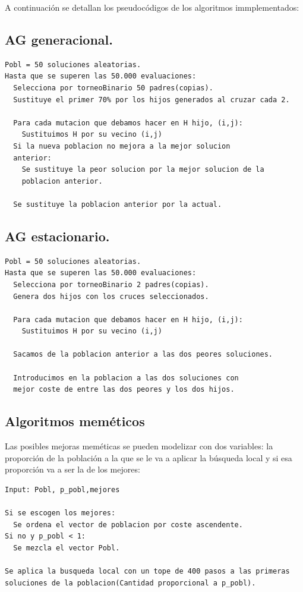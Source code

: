 A continuación se detallan los pseudocódigos de los algoritmos immplementados:\\

\subsection{AG generacional.}

\begin{lstlisting}
Pobl = 50 soluciones aleatorias.
Hasta que se superen las 50.000 evaluaciones:
  Selecciona por torneoBinario 50 padres(copias).
  Sustituye el primer 70% por los hijos generados al cruzar cada 2.
  
  Para cada mutacion que debamos hacer en H hijo, (i,j):
    Sustituimos H por su vecino (i,j)
  Si la nueva poblacion no mejora a la mejor solucion
  anterior:
    Se sustituye la peor solucion por la mejor solucion de la
    poblacion anterior.
  
  Se sustituye la poblacion anterior por la actual.
\end{lstlisting}

\subsection{AG estacionario.}

\begin{lstlisting}
Pobl = 50 soluciones aleatorias.
Hasta que se superen las 50.000 evaluaciones:
  Selecciona por torneoBinario 2 padres(copias).
  Genera dos hijos con los cruces seleccionados.

  Para cada mutacion que debamos hacer en H hijo, (i,j):
    Sustituimos H por su vecino (i,j)

  Sacamos de la poblacion anterior a las dos peores soluciones.

  Introducimos en la poblacion a las dos soluciones con
  mejor coste de entre las dos peores y los dos hijos.
\end{lstlisting}

\subsection{Algoritmos meméticos}

Las posibles mejoras meméticas se pueden modelizar con dos variables: la proporción de la población a la que se le va a aplicar la búsqueda local y si esa proporción va a ser la de los mejores:

\begin{lstlisting}
Input: Pobl, p_pobl,mejores

Si se escogen los mejores:
  Se ordena el vector de poblacion por coste ascendente.
Si no y p_pobl < 1:
  Se mezcla el vector Pobl.

Se aplica la busqueda local con un tope de 400 pasos a las primeras
soluciones de la poblacion(Cantidad proporcional a p_pobl).
\end{lstlisting}

